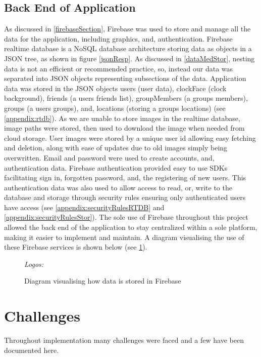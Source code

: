 \subsection{Back End of Application}
As discussed in \ref{firebaseSection}, Firebase was used to store and manage all the data for the application, including graphics, and, authentication. Firebase realtime database is a NoSQL database architecture storing data as objects in a JSON tree, as shown in figure \ref{jsonResp}. As discussed in \ref{dataMedStor}, nesting data is not an efficient or recommended practice, so, instead our data was separated into JSON objects representing subsections of the data. Application data was stored in the JSON objects users (user data), clockFace (clock background), friends (a users friends list), groupMembers (a groups members), groups (a users groups), and, locations (storing a groups locations) (see \ref{appendix:rtdb}). As we are unable to store images in the realtime database, image paths were stored, then used to download the image when needed from cloud storage. User images were stored by a unique user id allowing easy fetching and deletion, along with ease of updates due to old images simply being overwritten. Email and password were used to create accounts, and, authentication data. Firebase authentication provided easy to use SDKs facilitating sign in, forgotten password, and, the registering of new users. This authentication data was also used to allow access to read, or, write to the database and storage through security rules ensuring only authenticated users have access (see \ref{appendix:securityRulesRTDB} and \ref{appendix:securityRulesStor}). The sole use of Firebase throughout this project allowed the back end of the application to stay centralized within a sole platform, making it easier to implement and maintain. A diagram visualising the use of these Firebase services is shown below (see \ref{fig:firebaseDiag}).
\begin{figure}[!htbp]
    \centering
    \begin{subfigure}[b]{\textwidth}
    \end{subfigure}
    \caption{Diagram visualising how data is stored in Firebase} \small\textit{{Logos: \cite{storImg, rtdbImg, authImg}}}
    \label{fig:firebaseDiag}
\end{figure}
\FloatBarrier
\section{Challenges}
Throughout implementation many challenges were faced and a few have been documented here.
